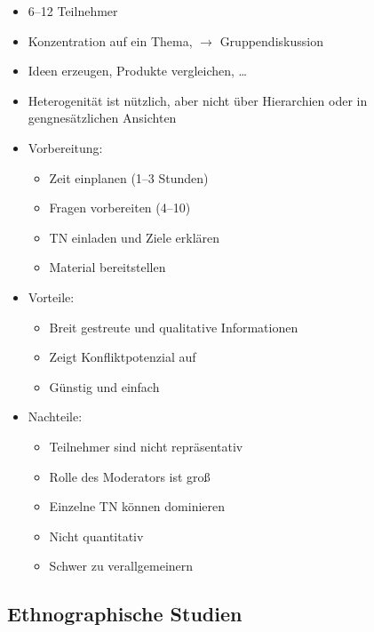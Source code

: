 \begin{itemize}
\item
  6--12 Teilnehmer
\item
  Konzentration auf ein Thema, $\rightarrow$ Gruppendiskussion
\item
  Ideen erzeugen, Produkte vergleichen, \ldots{}
\item
  Heterogenität ist nützlich, aber nicht über Hierarchien oder in
  gengnesätzlichen Ansichten
\item
  Vorbereitung:

  \begin{itemize}
  \item
    Zeit einplanen (1--3 Stunden)
  \item
    Fragen vorbereiten (4--10)
  \item
    TN einladen und Ziele erklären
  \item
    Material bereitstellen
  \end{itemize}
\item
  Vorteile:

  \begin{itemize}
  \item
    Breit gestreute und qualitative Informationen
  \item
    Zeigt Konfliktpotenzial auf
  \item
    Günstig und einfach
  \end{itemize}
\item
  Nachteile:

  \begin{itemize}
  \item
    Teilnehmer sind nicht repräsentativ
  \item
    Rolle des Moderators ist groß
  \item
    Einzelne TN können dominieren
  \item
    Nicht quantitativ
  \item
    Schwer zu verallgemeinern
  \end{itemize}
\end{itemize}

\subsection{Ethnographische Studien}

